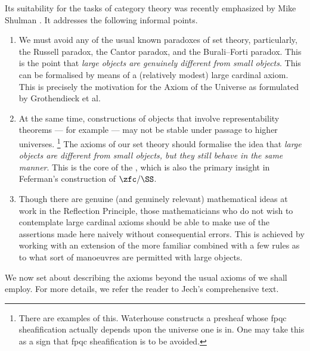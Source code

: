 Its suitability for the tasks of category theory was recently emphasized by Mike Shulman \cite{Shulman:2008th}.
It addresses the following informal points.
\begin{enumerate}
	\item We must avoid any of the usual known paradoxes of set theory,
		particularly, the Russell paradox, the Cantor paradox, and the Burali–Forti paradox.
		This is the point that \emph{large objects are genuinely different from small objects}.
		This can be formalised by means of a (relatively modest) large cardinal axiom.
		This is precisely the motivation for the Axiom of the Universe
		as formulated by Grothendieck et al.\cite[Exposé I, \S 0 and Appendix]{Anonymous:1972tk}
	\item At the same time, constructions of objects that involve representability theorems --- for example --- may not be stable under passage to higher universes.%
		\footnote{There are examples of this.
			Waterhouse constructs a presheaf whose fpqc sheafification actually depends upon the universe one is in.
			One may take this as a sign that fpqc sheafification is to be avoided.}
		The axioms of our set theory should formalise the idea that \emph{large objects are different from small objects, but they still behave in the same manner}.
		This is the core of the , which is also the primary insight in Feferman's construction of $\zfc/\SS$.
	\item Though there are genuine (and genuinely relevant) mathematical ideas at work in the Reflection Principle,
		those mathematicians who do not wish to contemplate large cardinal axioms should be able to make use of the assertions made here naively without consequential errors.
		This is achieved by working with an extension of the more familiar \zfc combined with a few rules as to what sort of manoeuvres are permitted with large objects.
\end{enumerate}

We now set about describing the axioms beyond the usual axioms of \zfc we shall employ.
For more details, we refer the reader to Jech's comprehensive text.\cite{Jech:2003tt}

